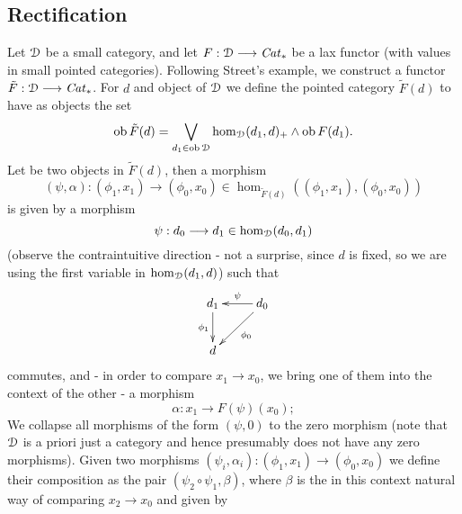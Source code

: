   \subsection{Rectification}

    \begin{defn}\label{def_streets_first_construction_functor}
      Let $\mathcal{D}$ be a small category, and let $F: \mathcal{D} \longrightarrow \mathit{Cat}_*$ be a lax functor (with values in small pointed categories).
      Following Street's example, we construct a functor $\tilde{F}: \mathcal{D} \longrightarrow \mathit{Cat}_*$.
      For $d$ and object of $\mathcal{D}$ we define the pointed category $\tilde{F}(d)$ to have as objects the set 
      \begin{displaymath}
        \operatorname{ob} \tilde{F}(d) = \bigvee_{d_1 \in \operatorname{ob} \mathcal{D}} \operatorname{hom}_{\mathcal{D}}(d_1,d)_+ \wedge \operatorname{ob} F(d_1).
      \end{displaymath}
      Let 
      be two objects in $\tilde{F}(d)$, then a morphism 
      \begin{displaymath}
        (\psi, \alpha) \colon (\phi_1,x_1) \to (\phi_0,x_0) \in \hom_{\tilde{F}(d)}((\phi_1,x_1), (\phi_0,x_0))
      \end{displaymath}  
      is given by a morphism 
      \begin{displaymath}
        \psi: d_0 \longrightarrow d_1 \in \operatorname{hom}_{\mathcal{D}}(d_0,d_1)
      \end{displaymath}  
      (observe the contraintuitive direction - not a surprise, since $d$ is fixed, so we are using the first variable in $\operatorname{hom}_{\mathcal{D}}(d_1,d)$) such that 
      \begin{displaymath}
        \xymatrix{
          d_1 \ar[d]_{\phi_1} & d_0 \ar[l]_{\psi} \ar[dl]^{\phi_0} \\
          d
        }
      \end{displaymath}  
      commutes, and - in order to compare $x_1 \to x_0$, we bring one of them into the context of the other - a morphism 
      \begin{displaymath}
        \alpha \colon x_1 \to F(\psi)(x_0);
      \end{displaymath}  
      We collapse all morphisms of the form $(\psi,0)$ to the zero morphism (note that $\mathcal{D}$ is a priori just a category and hence presumably does not have any zero morphisms).
      Given two morphisms $(\psi_i,\alpha_i)\colon(\phi_1,x_1) \to (\phi_0,x_0)$ we define their composition as the pair $(\psi_2 \circ \psi_1, \beta)$, where $\beta$ is the in this context natural way of comparing $x_2 \to x_0$ and given by
      \begin{displaymath}

\end{displaymath}
\end{defn}
